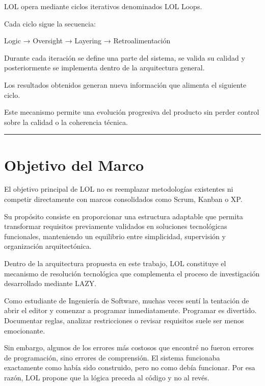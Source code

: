 \documentclass[14pt,a4paper,oneside]{extbook}
\begin{document}
LOL opera mediante ciclos iterativos denominados LOL Loops.

Cada ciclo sigue la secuencia:

Logic → Oversight → Layering → Retroalimentación

Durante cada iteración se define una parte del sistema, se valida su calidad y posteriormente se implementa dentro de la arquitectura general.

Los resultados obtenidos generan nueva información que alimenta el siguiente ciclo.

Este mecanismo permite una evolución progresiva del producto sin perder control sobre la calidad o la coherencia técnica.

\par\vspace{1.5em}\noindent\hfill\rule{0.25\textwidth}{0.6pt}\hfill\par\vspace{1.5em}

\section{Objetivo del Marco}

El objetivo principal de LOL no es reemplazar metodologías existentes ni competir directamente con marcos consolidados como Scrum, Kanban o XP.

Su propósito consiste en proporcionar una estructura adaptable que permita transformar requisitos previamente validados en soluciones tecnológicas funcionales, manteniendo un equilibrio entre simplicidad, supervisión y organización arquitectónica.

Dentro de la arquitectura propuesta en este trabajo, LOL constituye el mecanismo de resolución tecnológica que complementa el proceso de investigación desarrollado mediante LAZY.

\begin{authorobservation}
Como estudiante de Ingeniería de Software, muchas veces sentí la tentación de abrir el editor y comenzar a programar inmediatamente. Programar es divertido. Documentar reglas, analizar restricciones o revisar requisitos suele ser menos emocionante.

Sin embargo, algunos de los errores más costosos que encontré no fueron errores de programación, sino errores de comprensión. El sistema funcionaba exactamente como había sido construido, pero no como debía funcionar. Por esa razón, LOL propone que la lógica preceda al código y no al revés.
\end{authorobservation}
\end{document}
